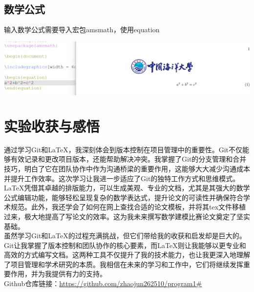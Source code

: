 \documentclass[UTF8,a4paper]{ctexart}
\begin{document}
\begin{sloppypar}
	\subsection{数学公式}
	输入数学公式需要导入宏包amsmath，使用equation
	
	\includegraphics[width = 16cm]{20}

	\section{实验收获与感悟}
	通过学习Git和LaTeX，我深刻体会到版本控制在项目管理中的重要性。Git不仅能够有效记录和更改项目版本，还能帮助解决冲突。我掌握了Git的分支管理和合并技巧，明白了它在团队协作中作为沟通桥梁的重要作用，这能够大大减少沟通成本并提升工作效率。这次学习让我进一步适应了Git的独特工作方式和思维模式。\\
	\indent LaTeX凭借其卓越的排版能力，可以生成美观、专业的文档，尤其是其强大的数学公式编辑功能，能够轻松呈现复杂的数学表达式，提升论文的可读性并确保符合学术规范。此外，我还学会了如何在网上查找合适的论文模板，并将其tex文件移植过来，极大地提高了写论文的效率。这为我未来撰写数学建模比赛论文奠定了坚实基础。\\
	\indent 虽然学习Git和LaTeX的过程充满挑战，但它们带给我的收获和启发却是巨大的。Git让我掌握了版本控制和团队协作的核心要素，而LaTeX则让我能够以更专业和高效的方式编写文档。这两种工具不仅提升了我的技术能力，也让我更深入地理解了项目管理和学术研究的本质。我相信在未来的学习和工作中，它们将继续发挥重要作用，并为我提供有力的支持。\\
	
	Github仓库链接：\url{https://github.com/zhaojun262510/program1#}
	
\end{sloppypar}
\end{document}
